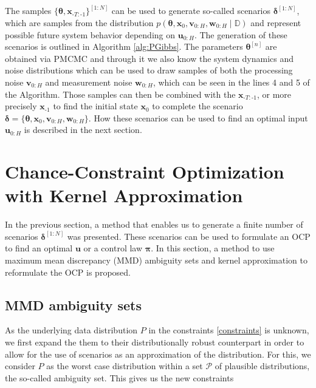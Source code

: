 The samples $\{\boldsymbol{\theta}, \boldsymbol{x}_{\text{-}T:\text{-}1}\}^{[1:N]}$ can be used to generate so-called scenarios $\boldsymbol{\delta}^{[1:N]}$, which are samples from the distribution $p(\boldsymbol{\theta}, \boldsymbol{x}_0, \boldsymbol{v}_{0:H}, \boldsymbol{w}_{0:H} \mid \mathbb{D})$ and represent possible future system behavior depending on $\boldsymbol{u}_{0:H}$. The generation of these scenarios is outlined in Algorithm \ref{alg:PGibbs}. The parameters $\boldsymbol{\theta}^{[n]}$ are obtained via PMCMC and through it we also know the system dynamics and noise distributions which can be used to draw samples of both the processing noise $\boldsymbol{v}_{0:H}$ and measurement noise $\boldsymbol{w}_{0:H}$, which can be seen in the lines 4 and 5 of the Algorithm. Those samples can then be combined with the $\boldsymbol{x}_{\text{-}T:\text{-}1}$, or more precisely $\boldsymbol{x}_{\text{-}1}$ to find the initial state $\boldsymbol{x}_{0}$ to complete the scenario $\boldsymbol{\delta} = \{ \boldsymbol{\theta}, \boldsymbol{x}_0, \boldsymbol{v}_{0:H}, \boldsymbol{w}_{0:H}\}$. How these scenarios can be used to find an optimal input $\boldsymbol{u}_{0:H}$ is described in the next section.


\section{Chance-Constraint Optimization with Kernel Approximation} \label{Sec:CCOKernel}

In the previous section, a method that enables us to generate a finite number of scenarios $\boldsymbol{\delta}^{[1:N]}$ was presented. These scenarios can be used to formulate an OCP to find an optimal $\boldsymbol{u}$ or a control law $\boldsymbol{\pi}$. In this section, a method to use maximum mean discrepancy (MMD) ambiguity sets and kernel approximation to reformulate the OCP is proposed.


\subsection{MMD ambiguity sets} \label{SubSec:MMD}

As the underlying data distribution $P$ in the constraints \eqref{constraints} is unknown, we first expand the them to their distributionally robust counterpart in order to allow for the use of scenarios as an approximation of the distribution. For this, we consider $P$ as the worst case distribution within a set $\mathcal{P}$ of plausible distributions, the so-called ambiguity set. This gives us the new constraints

